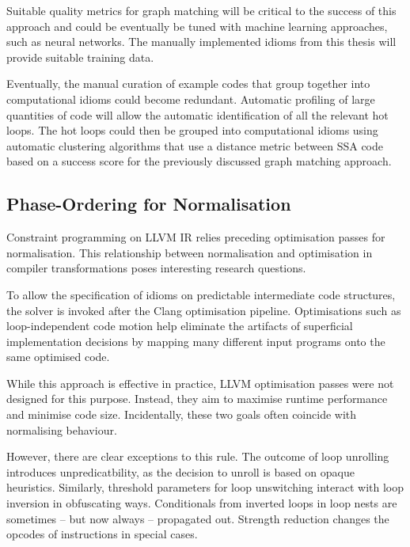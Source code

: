    Suitable quality metrics for graph matching will be critical to the success
    of this approach and could be eventually be tuned with machine learning
    approaches, such as neural networks.
    The manually implemented idioms from this thesis will provide suitable
    training data.

    Eventually, the manual curation of example codes that group together into
    computational idioms could become redundant.
    Automatic profiling of large quantities of code will allow the automatic
    identification of all the relevant hot loops.
    The hot loops could then be grouped into computational idioms using
    automatic clustering algorithms that use a distance metric between SSA code
    based on a success score for the previously discussed graph matching
    approach.


\subsection*{Phase-Ordering for Normalisation}

    Constraint programming on LLVM IR relies preceding optimisation passes
    for normalisation.
    This relationship between normalisation and optimisation in compiler
    transformations poses interesting research questions.

    To allow the specification of idioms on predictable intermediate code
    structures, the solver is invoked after the Clang optimisation pipeline.
    Optimisations such as loop-independent code motion help eliminate the
    artifacts of superficial implementation decisions by mapping many different
    input programs onto the same optimised code.

    While this approach is effective in practice, LLVM optimisation passes were
    not designed for this purpose.
    Instead, they aim to maximise runtime performance and minimise code size.
    Incidentally, these two goals often coincide with normalising behaviour.

    However, there are clear exceptions to this rule.
    The outcome of loop unrolling introduces unpredicatbility, as the decision
    to unroll is based on opaque heuristics.
    Similarly, threshold parameters for loop unswitching interact with loop
    inversion in obfuscating ways.
    Conditionals from inverted loops in loop nests are sometimes -- but
    now always -- propagated out.
    Strength reduction changes the opcodes of instructions in special cases.

